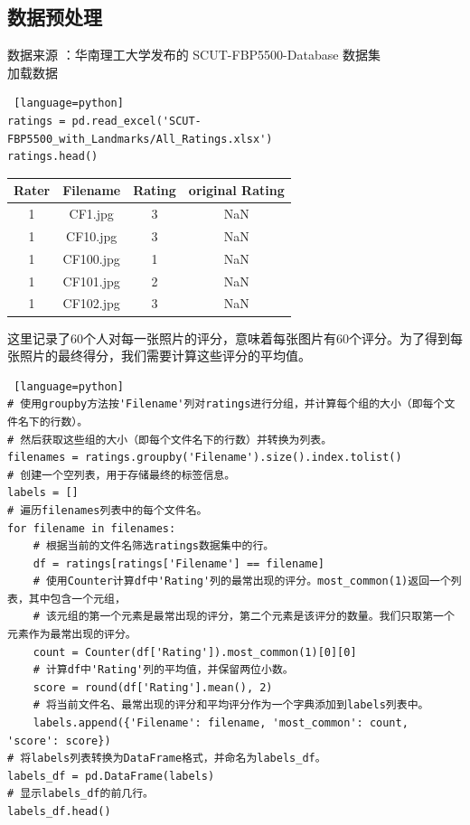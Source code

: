 \documentclass{article}
\begin{document}
\subsection{数据预处理}
数据来源 ：华南理工大学发布的 SCUT-FBP5500-Database 数据集\\
加载数据
\begin{lstlisting} [language=python]
ratings = pd.read_excel('SCUT-FBP5500_with_Landmarks/All_Ratings.xlsx')
ratings.head()
\end{lstlisting}

\begin{tabular}{cccc}%
\toprule %
Rater& Filename& Rating& original Rating\\
\midrule %
1& CF1.jpg& 3& NaN\\
1& CF10.jpg& 3& NaN\\
1& CF100.jpg& 1& NaN\\
1& CF101.jpg& 2& NaN\\
1& CF102.jpg& 3& NaN\\
\bottomrule %
\end{tabular}

这里记录了60个人对每一张照片的评分，意味着每张图片有60个评分。为了得到每张照片的最终得分，我们需要计算这些评分的平均值。
\begin{lstlisting} [language=python]
# 使用groupby方法按'Filename'列对ratings进行分组，并计算每个组的大小（即每个文件名下的行数）。  
# 然后获取这些组的大小（即每个文件名下的行数）并转换为列表。  
filenames = ratings.groupby('Filename').size().index.tolist()  
# 创建一个空列表，用于存储最终的标签信息。  
labels = []  
# 遍历filenames列表中的每个文件名。  
for filename in filenames:  
    # 根据当前的文件名筛选ratings数据集中的行。  
    df = ratings[ratings['Filename'] == filename]  
    # 使用Counter计算df中'Rating'列的最常出现的评分。most_common(1)返回一个列表，其中包含一个元组，  
    # 该元组的第一个元素是最常出现的评分，第二个元素是该评分的数量。我们只取第一个元素作为最常出现的评分。  
    count = Counter(df['Rating']).most_common(1)[0][0]  
    # 计算df中'Rating'列的平均值，并保留两位小数。  
    score = round(df['Rating'].mean(), 2)  
    # 将当前文件名、最常出现的评分和平均评分作为一个字典添加到labels列表中。  
    labels.append({'Filename': filename, 'most_common': count, 'score': score})  
# 将labels列表转换为DataFrame格式，并命名为labels_df。  
labels_df = pd.DataFrame(labels)  
# 显示labels_df的前几行。  
labels_df.head()
\end{lstlisting}
\end{document}
